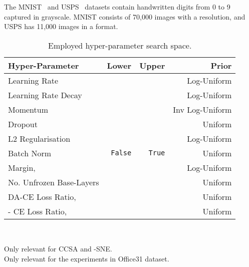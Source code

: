 \documentclass[journal]{IEEEtran}
\begin{document}
The MNIST~\cite{lecun1998gradient} and USPS~\cite{lecun90handwritten} datasets contain handwritten digits from 0 to 9 captured in grayscale. MNIST consists of 70,000 images with a  resolution, and USPS has 11,000 images in a  format.

\begin{table}
	\begin{center}\caption{Employed hyper-parameter search space.}
	\label{tab:search-space}
\begin{tabular}{lrrr}
		\toprule
        Hyper-Parameter 
		    & Lower
		    & Upper
		    & Prior
            \\
		\midrule
		Learning Rate
    		& 
    		& 	
    		& Log-Uniform
    		\\
	    Learning Rate Decay
    	    & 
    		& 
    		& Log-Uniform
    		\\
        Momentum 
            & 
    		& 
    		& Inv Log-Uniform
    		\\
    	Dropout
            & 
    		& 
    		& Uniform
    		\\
    	L2 Regularisation
            & 
    		& 
    		& Log-Uniform
    		\\
    	Batch Norm
            & \texttt{False}
    		& \texttt{True}
    		& Uniform
    		\\
    	Margin,  \textsuperscript{\textsection}
            & 
    		& 
    		& Log-Uniform
    		\\
    	No. Unfrozen Base-Layers \textsuperscript{\textparagraph}
            & 
    		& 
    		& Uniform
    		\\
    	DA-CE Loss Ratio, 
            & 
    		& 	
    		& Uniform	
    		\\
    	- CE Loss Ratio, 
            & 
    		& 
    		& Uniform
    		\\
		\bottomrule
	\end{tabular}\\
	\end{center}
	\textsuperscript{\textsection}Only relevant for CCSA and -SNE.\\
	\textsuperscript{\textparagraph}Only relevant for the experiments in Office31 dataset.
\end{table}
\end{document}
